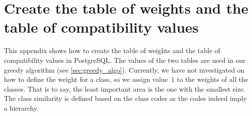 \documentclass[twocolumn]{svjour3}          %
\begin{document}


%
%



\onecolumn
\appendix

\section{Create the table of weights and the table of compatibility values}
\label{appx:create_tables}
This appendix shows how to create the table of weights and 
the table of compatibility values in PostgreSQL.
The values of the two tables are used in our greedy algorithm
(see \sect\ref{sec:greedy_algo}).
Currently, we have not investigated on 
how to define the weight for a class,
so we assign value~$1$ to the weights of all the classes.
That is to say, the least important area is the one with the smallest size.
The class similarity is defined based on the class codes 
as the codes indeed imply a hierarchy.

\bigskip
\end{document}
